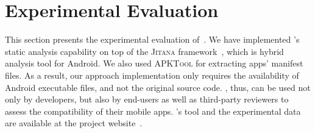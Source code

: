 \def \apitotalALL {68,268}
\def \apctotalALL {2,115}

\def \apicountALL {1,471}
\def \apiprcntALL {41.19\%}
\def \apicountZOO {878}
\def \apicountFDR {593}

\def \apccountALL {761}
\def \apcprcntALL {20.05\%}
\def \apccountZOO {464}
\def \apccountFDR {252}

\def \andzooct {2,180}
\def \fdroidct {1,391}

\def \prqcount {224}
\def \prqprcnt {12.34\%}
\def \prqtotal {1,815}

\def \prvcount {1,206}
\def \prvprcnt {68.68\%}
\def \prvtotal {1,756}

\def \prmcount {1,430}
\def \prmprcnt {40.04\%}

\def \rqoneapps {19}

\section{Experimental Evaluation}
\label{sec-eval}

This section presents the experimental evaluation of~\@approach. 
We have implemented \@approach's static analysis capability on top of the \textsc{Jitana} framework~\cite{tsutano2017efficient}, %
which is hybrid analysis tool for Android.
We also used \textsc{APKTool} \cite{apktool} for %
extracting apps' manifest files.
As a result, our approach implementation only requires the availability of Android executable files, and not the original source code. \@approach, thus, can be used not only by developers, but also by end-users as well as third-party reviewers to assess the compatibility of their mobile apps.
\@approach's tool and the experimental data are available at the project website~\cite{GainDroid}.




